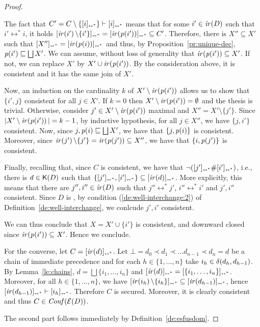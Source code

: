 \begin{proof}
\begin{itemize}
    The fact that
    $C' = C \setminus \{ [{i}]_{\scriptscriptstyle {\leftrightarrow^*}} \} \vdash [{i}]_{\scriptscriptstyle {\leftrightarrow^*}}$ means
    that for some $i' \in \mathop{\mathit{ir}({D})}$ such that $i' \leftrightarrow^* i$, it holds
    $[{\mathop{\mathit{ir}({i'})} \setminus \{i'\}}]_{\scriptscriptstyle {\leftrightarrow^*}} = [{\mathop{\mathit{ir}({\mathit{p}({i'})})}}]_{\scriptscriptstyle {\leftrightarrow^*}}
    \subseteq C'$.
    Therefore, there is $X'' \subseteq X'$ such that
    $[{X''}]_{\scriptscriptstyle {\leftrightarrow^*}} = [{\mathop{\mathit{ir}({\mathit{p}({i})})}}]_{\scriptscriptstyle {\leftrightarrow^*}}$ and thus, by
    Proposition~\ref{pr:unique-dec},
    $\mathit{p}({i'}) \sqsubseteq \bigsqcup X'$.
    We can assume, without loss of generality that
    $\mathop{\mathit{ir}({\mathit{p}({i'})})} \subseteq X'$. If not, we can replace $X'$ by
    $X' \cup \mathop{\mathit{ir}({\mathit{p}({i'})})}$. By the consideration above, it is
    consistent and it has the same join of $X'$.

    Now, an induction on the cardinality $k$ of
    $X' \setminus \mathop{\mathit{ir}({\mathit{p}({i'})})}$ allows us to show that $\{i', j\}$
    consistent for all $j \in X'$. If $k=0$ then
    $X' \setminus \mathop{\mathit{ir}({\mathit{p}({i'})})} =\emptyset$ and the thesis is
    trivial. Otherwise, consider $j' \in X' \setminus \mathop{\mathit{ir}({\mathit{p}({i'})})}$
    maximal and $X'' = X' \setminus \{j'\}$. Since
    $|X' \setminus \mathop{\mathit{ir}({\mathit{p}({i'})})}|=k-1$, by inductive hypothesis, for
    all $j \in X''$, we have $\{j,i'\}$ consistent. Now, since
    $j, \mathit{p}({i}) \sqsubseteq \bigsqcup X'$, we have that
    $\{j, \mathit{p}({i})\}$ is consistent. Moreover, since
    $\mathop{\mathit{ir}({j'})} \setminus\{j'\} = \mathop{\mathit{ir}({\mathit{p}({j'})})} \subseteq X''$, we have
    that $\{i, \mathit{p}({j'})\}$ is consistent. 

    Finally, recalling that, since $C$ is
    consistent, we have that
    $\neg ([{j'}]_{\scriptscriptstyle {\leftrightarrow^*}} \# [{i'}]_{\scriptscriptstyle {\leftrightarrow^*}})$, i.e., there is
    $d \in \mathop{\mathsf{K}({D})}$ such that
    $\{ [{j'}]_{\scriptscriptstyle {\leftrightarrow^*}}, [{i'}]_{\scriptscriptstyle {\leftrightarrow^*}} \} \subseteq
    [{\mathop{\mathit{ir}({d})}}]_{\scriptscriptstyle {\leftrightarrow^*}}$. More explicitly, this means that there are
    $j'', i'' \in \mathop{\mathit{ir}({D})}$ such that $j'' \leftrightarrow^* j'$,
    $i'' \leftrightarrow^* i'$ and $j', i''$ consistent.
    Since $D$ is {\wi}, by condition (\ref{de:well-interchange:2}) of
    Definition~\ref{de:well-interchange}, we conlcude $j', i'$
    consistent.


    We can thus conclude that $X = X' \cup \{ i' \}$ is consistent,
    and downward closed since
    $\mathop{\mathit{ir}({\mathit{p}({i'})})} \subseteq X'$. Hence we conclude.
  \end{itemize}

  \bigskip

  For the converse, let $C = [{\mathop{\mathit{ir}({d})}}]_{\scriptscriptstyle {\leftrightarrow^*}}$. Let
  $\bot = d_0 \prec d_1 \prec \ldots d_{n-1} \prec d_n = d$ be a chain
  of immediate precedence and for each $h \in \{1, \ldots, n\}$ take
  $i_h \in \delta({d_h},{d_{h-1}})$. By Lemma~\ref{le:chains},
  $d = \bigsqcup \{ i_1, \ldots, i_n\}$ and
  $[{\mathop{\mathit{ir}({d})}}]_{\scriptscriptstyle {\leftrightarrow^*}} = [{\{ i_1, \ldots, i_n\}}]_{\scriptscriptstyle {\leftrightarrow^*}}$. Moreover,
  for all $h \in \{1, \ldots, n\}$, we have
  $[{\mathop{\mathit{ir}({i_h})} \setminus \{ i_h \}}]_{\scriptscriptstyle {\leftrightarrow^*}} \subseteq
  [{\mathop{\mathit{ir}({d_{h-1}})}}]_{\scriptscriptstyle {\leftrightarrow^*}}$, hence
  $[{\mathop{\mathit{ir}({d_{h-1}})}}]_{\scriptscriptstyle {\leftrightarrow^*}} \vdash [{i_h}]_{\scriptscriptstyle {\leftrightarrow^*}}$. Therefore $C$ is
  secured. Moreover, it is clearly consistent and thus
  $C \in \mathit{Conf}({\mathcal{E}({D})})$.


  \bigskip

  The second part follows immediately by Definition~\ref{de:esfusdom}.
\end{proof}


